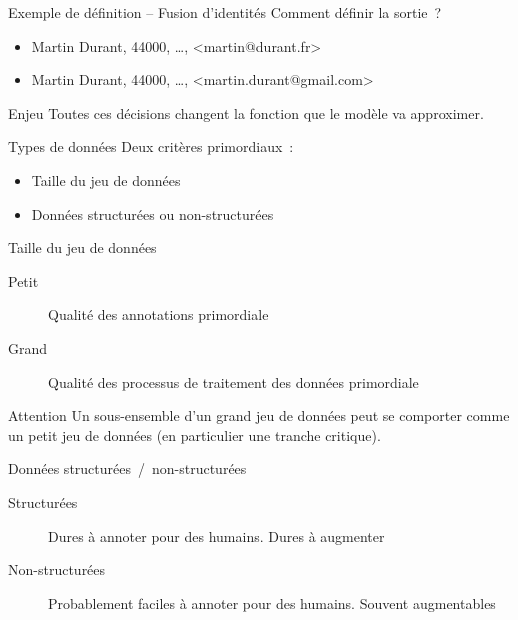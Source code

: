 \begin{frame}{Exemple de définition – Fusion d'identités}
  Comment définir la sortie~?
  \begin{itemize}
    \item Martin Durant, 44000, …, <martin@durant.fr>
    \item Martin Durant, 44000, …, <martin.durant@gmail.com>
  \end{itemize}
\end{frame}

\begin{frame}{Enjeu}
  Toutes ces décisions changent la fonction que le modèle va approximer.
\end{frame}

\begin{frame}{Types de données}
  Deux critères primordiaux~:

  \begin{itemize}
    \item Taille du jeu de données
    \item Données structurées ou non-structurées
  \end{itemize}
\end{frame}

\begin{frame}{Taille du jeu de données}
  \begin{description}
    \item[Petit] Qualité des annotations primordiale
    \item[Grand] Qualité des processus de traitement des données primordiale
  \end{description}

  \begin{block}{Attention}
    Un sous-ensemble d'un grand jeu de données peut se comporter comme un petit jeu de données (en particulier une tranche critique).
  \end{block}
\end{frame}

\begin{frame}{Données structurées~/~non-structurées}
  \begin{description}
    \item[Structurées] Dures à annoter pour des humains. Dures à augmenter
    \item[Non-structurées] Probablement faciles à annoter pour des humains. Souvent augmentables
  \end{description}
\end{frame}

